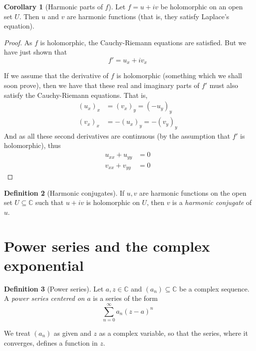 \documentclass[10pt,fleqn]{article}
\newcommand{\comps}{\mathbb{C}}
\theoremstyle{definition} \newtheorem{defn}{Definition}[section]
\theoremstyle{plain}      \newtheorem{thm}[defn]{Theorem}
\theoremstyle{definition} \newtheorem{prop}[defn]{Proposition}
\theoremstyle{plain}      \newtheorem{lem}[defn]{Lemma}
\theoremstyle{definition} \newtheorem{cor}[defn]{Corollary}
\theoremstyle{definition} \newtheorem{ex}[defn]{Example}
\theoremstyle{definition} \newtheorem{rem}[defn]{Remark}
\begin{document}
\begin{cor}[Harmonic parts of $f$]
    Let $f=u+iv$ be holomorphic on an open set $U$.
    Then $u$ and $v$ are harmonic functions (that is, they satisfy Laplace's equation).
\end{cor}

\begin{proof}
    As $f$ is holomorphic, the Cauchy-Riemann equations are satisfied.
    But we have just shown that
    \[
        f'=u_x+iv_x
    \]

    If we assume that the derivative of $f$ is holomorphic (something which we shall soon prove), then we have that these real and imaginary parts of $f'$ must also satisfy the Cauchy-Riemann equations.
    That is,
    \begin{align*}
        (u_x)_x&=(v_x)_y=(-u_y)_y\\
        (v_x)_x&=-(u_x)_y=-(v_y)_y
    \end{align*}
    And as all these second derivatives are continuous (by the assumption that $f'$ is holomorphic), thus
    \begin{align*}
        u_{xx}+u_{yy}&=0\\
        v_{xx}+v_{yy}&=0
    \end{align*}
\end{proof}

\begin{defn}[Harmonic conjugates]
    If $u,v$ are harmonic functions on the open set $U\subseteq\comps$ such that $u+iv$ is holomorphic on $U$, then $v$ is a \emph{harmonic conjugate} of $u$.
\end{defn}


\section{Power series and the complex exponential}

\begin{defn}[Power series]
    Let $a,z\in\comps$ and $(a_n)\subseteq\comps$ be a complex sequence.
    A \emph{power series centered on $a$} is a series of the form
    \begin{equation}
        \sum_{n=0}^{\infty}a_n(z-a)^n
    \end{equation}

    We treat $(a_n)$ as given and $z$ as a complex variable, so that the series, where it converges, defines a function in $z$.
\end{defn}
\end{document}
